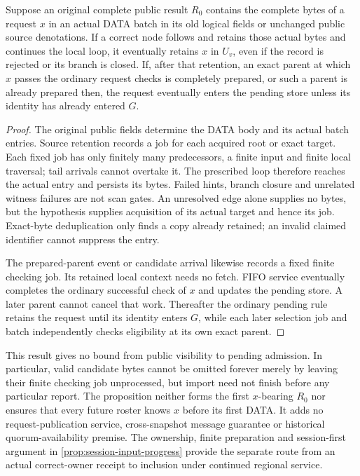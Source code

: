 \begin{proposition}
\label{prop:v39-public-request-import}
Suppose an original complete public result $R_0$ contains the complete
bytes of a request $x$ in an actual DATA batch in its old logical fields
or unchanged public source denotations. If a correct node follows and
retains those actual bytes and continues the local loop, it eventually
retains $x$ in $U_v$, even if the record is rejected or its branch is
closed. If, after that retention, an exact parent at which $x$ passes
the ordinary request checks is completely prepared, or such a parent
is already prepared then, the request eventually enters the pending
store unless its identity has already entered $G$.
\end{proposition}
\begin{proof}
The original public fields determine the DATA body and its actual batch
entries. Source retention records a job for each acquired root or exact
target. Each fixed job has only finitely many predecessors, a finite
input and finite local traversal; tail arrivals cannot overtake it.
The prescribed loop therefore reaches the actual entry and persists its
bytes. Failed hints, branch closure and unrelated witness failures are
not scan gates. An unresolved edge alone supplies no bytes, but the
hypothesis supplies acquisition of its actual target and hence its job.
Exact-byte deduplication only finds a copy already retained; an invalid
claimed identifier cannot suppress the entry.

The prepared-parent event or candidate arrival likewise records a fixed
finite checking job. Its retained local context needs no fetch. FIFO
service eventually completes the ordinary successful check of $x$ and
updates the pending store. A later parent cannot cancel that work.
Thereafter the ordinary pending rule retains the request until its
identity enters $G$, while each later selection job and batch independently checks
eligibility at its own exact parent.
\end{proof}

This result gives no bound from public visibility to pending admission.
In particular, valid candidate bytes cannot be omitted forever merely
by leaving their finite checking job unprocessed, but import need not
finish before any particular report. The proposition neither forms
the first $x$-bearing $R_0$ nor ensures that every future roster knows
$x$ before its first DATA. It adds no request-publication service,
cross-snapshot message guarantee or historical quorum-availability
premise. The ownership, finite preparation and session-first argument in
\cref{prop:session-input-progress} provide the separate route from an
actual correct-owner receipt to inclusion under continued regional service.
